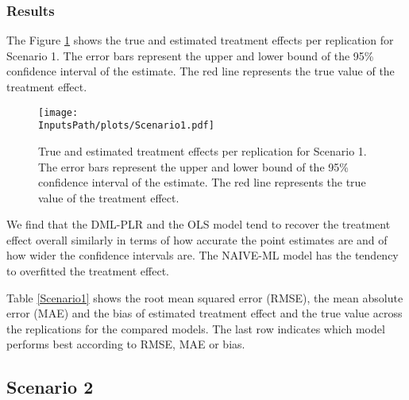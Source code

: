 \documentclass[10pt]{article}
\newcommand*{\InputsFolderPath}{C:/DEV/DML/src/data/}
\newcommand*{\InputsPath}{\InputsFolderPath/20221108}
\begin{document}
\subsubsection{Results}
The Figure \ref{Scenario 1} shows the true and estimated treatment effects per replication for Scenario 1. 
The error bars represent the upper and lower bound of the 95\% confidence interval of the estimate. 
The red line represents the true value of the treatment effect.
\begin{figure}[H]
	\begin{center}
		\texttt{[image: \\InputsPath/plots/Scenario1.pdf]}
		\caption{True and estimated treatment effects per replication for Scenario 1. The error bars represent the upper and lower bound of the 95\% confidence interval of the estimate. The red line represents the true value of the treatment effect.}
		\label{Scenario 1}
	\end{center}
\end{figure}
We find that the DML-PLR and the OLS model tend to recover the treatment effect overall similarly in terms of how accurate the point estimates are and of how wider the confidence intervals are.
The NAIVE-ML model has the tendency to overfitted the treatment effect.

Table \ref{Scenario1} shows the root mean squared error (RMSE), the mean absolute error (MAE) and the bias of estimated treatment effect and the true value across the replications for the compared models.
The last row indicates which model performs best according to RMSE, MAE or bias.



\subsection{Scenario 2}
\end{document}

